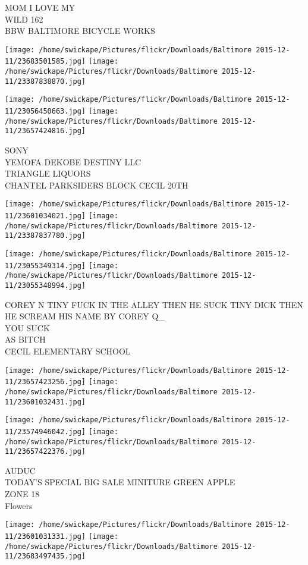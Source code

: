 \documentclass[10pt,letterpaper]{article}
\begin{document}
MOM I LOVE MY\\
WILD 162\\
BBW BALTIMORE BICYCLE WORKS
\pagebreak

\texttt{[image: /home/swickape/Pictures/flickr/Downloads/Baltimore 2015-12-11/23683501585.jpg]}
\texttt{[image: /home/swickape/Pictures/flickr/Downloads/Baltimore 2015-12-11/23387838870.jpg]}

\texttt{[image: /home/swickape/Pictures/flickr/Downloads/Baltimore 2015-12-11/23056450663.jpg]}
\texttt{[image: /home/swickape/Pictures/flickr/Downloads/Baltimore 2015-12-11/23657424816.jpg]}

SONY\\
YEMOFA DEKOBE DESTINY LLC\\
TRIANGLE LIQUORS\\
CHANTEL PARKSIDERS BLOCK CECIL 20TH
\pagebreak

\texttt{[image: /home/swickape/Pictures/flickr/Downloads/Baltimore 2015-12-11/23601034021.jpg]}
\texttt{[image: /home/swickape/Pictures/flickr/Downloads/Baltimore 2015-12-11/23387837780.jpg]}

\texttt{[image: /home/swickape/Pictures/flickr/Downloads/Baltimore 2015-12-11/23055349314.jpg]}
\texttt{[image: /home/swickape/Pictures/flickr/Downloads/Baltimore 2015-12-11/23055348994.jpg]}

COREY N TINY FUCK IN THE ALLEY THEN HE SUCK TINY DICK THEN HE SCREAM HIS NAME BY COREY Q\_\\
YOU SUCK\\
AS BITCH\\
CECIL ELEMENTARY SCHOOL
\pagebreak

\texttt{[image: /home/swickape/Pictures/flickr/Downloads/Baltimore 2015-12-11/23657423256.jpg]}
\texttt{[image: /home/swickape/Pictures/flickr/Downloads/Baltimore 2015-12-11/23601032431.jpg]}

\texttt{[image: /home/swickape/Pictures/flickr/Downloads/Baltimore 2015-12-11/23574946042.jpg]}
\texttt{[image: /home/swickape/Pictures/flickr/Downloads/Baltimore 2015-12-11/23657422376.jpg]}

AUDUC\\
TODAY'S SPECIAL BIG SALE MINITURE GREEN APPLE\\
ZONE 18\\
Flowers
\pagebreak

\texttt{[image: /home/swickape/Pictures/flickr/Downloads/Baltimore 2015-12-11/23601031331.jpg]}
\texttt{[image: /home/swickape/Pictures/flickr/Downloads/Baltimore 2015-12-11/23683497435.jpg]}
\end{document}
